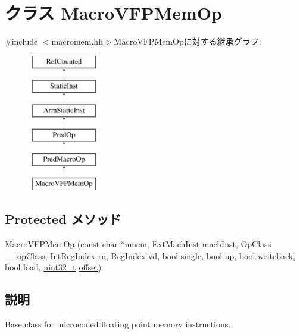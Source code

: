 \hypertarget{classArmISA_1_1MacroVFPMemOp}{
\section{クラス MacroVFPMemOp}
\label{classArmISA_1_1MacroVFPMemOp}
}


{\ttfamily \#include $<$macromem.hh$>$}MacroVFPMemOpに対する継承グラフ:\begin{figure}[H]
\begin{center}
\leavevmode
\includegraphics[height=6cm]{classArmISA_1_1MacroVFPMemOp}
\end{center}
\end{figure}
\subsection*{Protected メソッド}
\begin{DoxyCompactItemize}
\item 
\hyperlink{classArmISA_1_1MacroVFPMemOp_ac86efcec990c72ecd0ea1044552863f9}{MacroVFPMemOp} (const char $\ast$mnem, \hyperlink{classStaticInst_a5605d4fc727eae9e595325c90c0ec108}{ExtMachInst} \hyperlink{classStaticInst_a744598b194ca3d4201d9414ce4cc4af4}{machInst}, OpClass \_\-\_\-opClass, \hyperlink{namespaceArmISA_ae64680ba9fb526106829d6bf92fc791b}{IntRegIndex} \hyperlink{namespaceArmISA_adf8c6c579ad8729095a637a4f2181211}{rn}, \hyperlink{classStaticInst_a36d25e03e43fa3bb4c5482cbefe5e0fb}{RegIndex} vd, bool single, bool \hyperlink{namespaceArmISA_a3a82fdc0669ddcc0c196b1ac0220c55a}{up}, bool \hyperlink{namespaceArmISA_a8143fa40e9030da2e8b93ba9990a7bb1}{writeback}, bool load, \hyperlink{Type_8hh_a435d1572bf3f880d55459d9805097f62}{uint32\_\-t} \hyperlink{namespaceArmISA_a87b7a740701cddafb930a9460e9f4eba}{offset})
\end{DoxyCompactItemize}


\subsection{説明}
Base class for microcoded floating point memory instructions. 

